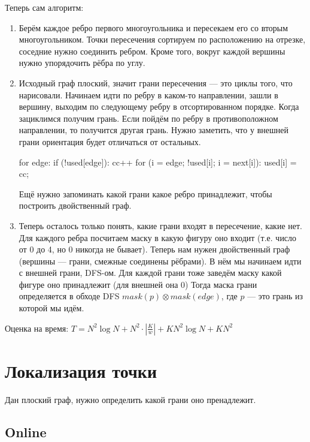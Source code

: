 Теперь сам алгоритм:
\begin{enumerate}
    \item Берём каждое ребро первого многоугольника и пересекаем его
        со вторым многоугольником. Точки пересечения сортируем по 
        расположению на отрезке, соседние нужно соединить ребром.
        Кроме того, вокруг каждой вершины нужно упорядочить рёбра
        по углу.

    \item Исходный граф плоский, значит грани пересечения --- это циклы 
        того, что нарисовали. Начинаем идти по ребру в каком-то направлении, 
        зашли в вершину, выходим по следующему ребру в отсортированном порядке.
        Когда зациклимся получим грань. Если пойдём по ребру в противоположном 
        направлении, то получится другая грань. Нужно заметить, что у внешней
        грани ориентация будет отличаться от остальных.

\begin{cppcode}
    for edge:
        if (!used[edge]):
            cc++
            for (i = edge; !used[i]; i = next[i]):
                used[i] = cc;
\end{cppcode}

        Ещё нужно запоминать какой грани какое ребро принадлежит, чтобы построить
        двойственный граф.

    \item Теперь осталось только понять, какие грани входят в пересечение,
        какие нет. Для каждого ребра посчитаем маску в какую фигуру оно входит
        (т.е. число от 0 до 4, но 0 никогда не бывает). Теперь нам нужен 
        двойственный граф (вершины --- грани, смежные соединены рёбрами).
        В нём мы начинаем идти с внешней грани, DFS-ом.
        Для каждой грани тоже заведём маску какой фигуре оно принадлежит (для внешней она 0)
        Тогда маска грани определяется в обходе DFS $mask(p) \otimes mask(edge)$, 
        где $p$ --- это грань из которой мы идём.
\end{enumerate}

Оценка на время: $T = N^2\log N + N^2 \cdot \left|\frac{K}{w}\right| + K N^2 \log N + KN^2$

\section{Локализация точки}

Дан плоский граф, нужно определить какой грани оно пренадлежит.

\subsection{Online}

